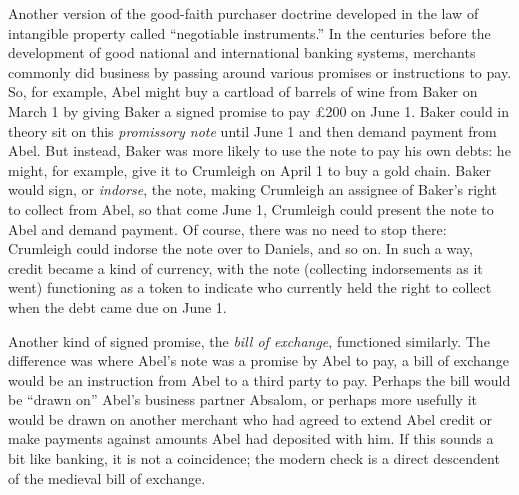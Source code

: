 


Another version of the good-faith purchaser doctrine developed in the law of
intangible property called ``negotiable instruments.'' In the centuries before
the development of good national and international banking systems, merchants
commonly did business by passing around various promises or instructions to
pay. So, for example, Abel might buy a cartload of barrels of wine from Baker
on March 1 by giving Baker a signed promise to pay {\pounds}200 on June 1.
Baker could in theory sit on this \textit{promissory note} until June 1 and
then demand payment from Abel. But instead, Baker was more likely to use the
note to pay his own debts: he might, for example, give it to Crumleigh on April
1 to buy a gold chain. Baker would sign, or \textit{indorse}, the note, making
Crumleigh an assignee of Baker's right to collect from Abel, so that come June
1, Crumleigh could present the note to Abel and demand payment. Of course,
there was no need to stop there: Crumleigh could indorse the note over to
Daniels, and so on. In such a way, credit became a kind of currency, with the
note (collecting indorsements as it went) functioning as a token to indicate
who currently held the right to collect when the debt came due on June 1.

Another kind of signed promise, the \textit{bill of exchange}, functioned
similarly. The difference was where Abel's note was a promise by Abel to pay, a
bill of exchange would be an instruction from Abel to a third party to pay.
Perhaps the bill would be ``drawn on'' Abel's business partner Absalom, or
perhaps more usefully it would be drawn on another merchant who had agreed to
extend Abel credit or make payments against amounts Abel had deposited with
him. If this sounds a bit like banking, it is not a coincidence; the modern
check is a direct descendent of the medieval bill of exchange.


